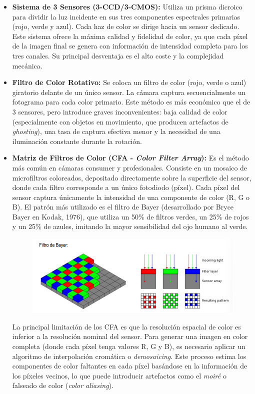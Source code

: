 \begin{itemize}
\item \textbf{Sistema de 3 Sensores (3-CCD/3-CMOS):} Utiliza un prisma dicroico para dividir la luz incidente en sus tres componentes espectrales primarias (rojo, verde y azul). Cada haz de color se dirige hacia un sensor dedicado. Este sistema ofrece la máxima calidad y fidelidad de color, ya que cada píxel de la imagen final se genera con información de intensidad completa para los tres canales. Su principal desventaja es el alto coste y la complejidad mecánica.
\item \textbf{Filtro de Color Rotativo:} Se coloca un filtro de color (rojo, verde o azul) giratorio delante de un único sensor. La cámara captura secuencialmente un fotograma para cada color primario. Este método es más económico que el de 3 sensores, pero introduce graves inconvenientes: baja calidad de color (especialmente con objetos en movimiento, que producen artefactos de \textit{ghosting}), una tasa de captura efectiva menor y la necesidad de una iluminación constante durante la rotación.
\item \textbf{Matriz de Filtros de Color (CFA - \textit{Color Filter Array}):} Es el método más común en cámaras consumer y profesionales. Consiste en un mosaico de microfiltros coloreados, depositado directamente sobre la superficie del sensor, donde cada filtro corresponde a un único fotodiodo (píxel). Cada píxel del sensor captura únicamente la intensidad de una componente de color (R, G o B). El patrón más utilizado es el filtro de Bayer (desarrollado por Bryce Bayer en Kodak, 1976), que utiliza un 50\% de filtros verdes, un 25\% de rojos y un 25\% de azules, imitando la mayor sensibilidad del ojo humano al verde.
\begin{figure}[h]
\centering
\includegraphics[width = \textwidth]{figs/filtro-bayer.png}
\end{figure}
La principal limitación de los CFA es que la resolución espacial de color es inferior a la resolución nominal del sensor. Para generar una imagen en color completa (donde cada píxel tenga valores R, G y B), es necesario aplicar un algoritmo de interpolación cromática o \textit{demosaicing}. Este proceso estima los componentes de color faltantes en cada píxel basándose en la información de los píxeles vecinos, lo que puede introducir artefactos como el \textit{moiré} o falseado de color (\textit{color aliasing}).
\end{itemize}

